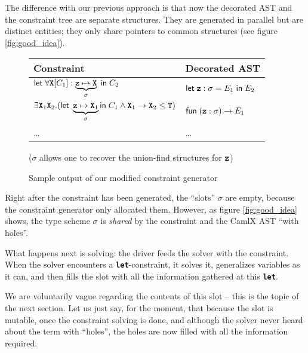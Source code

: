 \documentclass[10pt,a4paper,twoside,titlepage,twocolumn]{article}
\newcommand{\code}[1]{\textbf{\texttt{#1}}}
\begin{document}
The difference with our previous approach is that now the decorated AST
and the constraint tree are separate structures. They are generated in parallel
but are distinct entities; they only share pointers to common structures (see
figure \vref{fig:good_idea}).

\begin{figure}[h!]
  \small
    \begin{tabular}{l|l}
      \textbf{Constraint} & \textbf{Decorated AST} \\
      \hline


      $\cxlet{
          \forall\tvar[C_1]: \underbrace{\evar\mapsto\tvar}_{\sigma}
        }{C_2}$ &
        
      $\cxlet {\evar:\ts = E_1} {E_2}$ \\

      \hline


      $\exists\tvar_1\tvar_2.(
        \kwd{let}\;\underbrace{\evar\mapsto\tvar_1}_\sigma
        \kwd{in}\;{C_1}
        \wedge
        \tvar_1\arw\tvar_2\subtype\ttyp)$ &

      $\kwd{fun}\;(\evar: \sigma) \to E_1$ \\

      \hline

      \dots & \dots

    \end{tabular}
    (\centering $\sigma$ allows one to recover the union-find structures for $\evar$)
  \caption{Sample output of our modified constraint generator}
  \label{fig:good_idea}
\end{figure}

Right after the constraint has been generated, the ``slots'' $\sigma$
are empty, because the constraint generator only allocated them. However, as
figure \vref{fig:good_idea} shows, the type scheme $\sigma$ is \emph{shared} by
the constraint and the CamlX AST ``with holes''.

What happens next is solving: the driver feeds the solver with the constraint.
When the solver encounters a \code{let}-constraint, it solves it, generalizes
variables as it can, and then fills the slot with all the information gathered
at this \code{let}.

We are voluntarily vague regarding the contents of this slot -- this is the
topic of the next section. Let us just say, for the moment, that because the
slot is mutable, once the constraint solving is done, and although the solver
never heard about the term with ``holes'', the holes are now filled with all the
information required.
\end{document}
